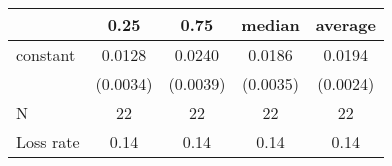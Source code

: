 \begin{tabular}{lcccc}
\hline
          &   0.25   &   0.75   &  median  & average   \\
\midrule
\midrule
constant  & 0.0128   & 0.0240   & 0.0186   & 0.0194    \\
          & (0.0034) & (0.0039) & (0.0035) & (0.0024)  \\
N         & 22       & 22       & 22       & 22        \\
Loss rate & 0.14     & 0.14     & 0.14     & 0.14      \\
\hline
\end{tabular}